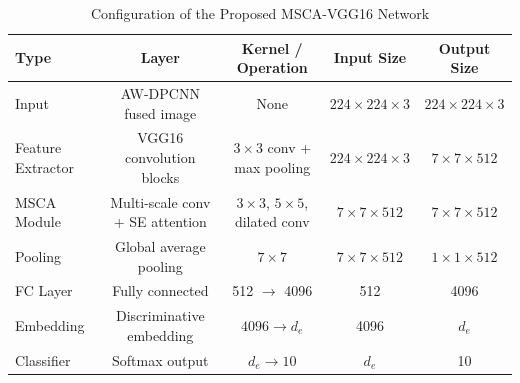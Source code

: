 \documentclass[journal]{IEEEtran}
\begin{document}
\begin{table}
	\centering
	\caption{Configuration of the Proposed MSCA-VGG16 Network}
	\begin{tabular}{lcccc}
		\toprule
		\textbf{Type} & \textbf{Layer} & \textbf{Kernel / Operation} & \textbf{Input Size} & \textbf{Output Size} \\
		\midrule
		Input & AW-DPCNN fused image & None & $224 \times 224 \times 3$ & $224 \times 224 \times 3$ \\
		Feature Extractor & VGG16 convolution blocks & $3\times3$ conv + max pooling & $224 \times 224 \times 3$ & $7 \times 7 \times 512$ \\
		MSCA Module & Multi-scale conv + SE attention & $3\times3$, $5\times5$, dilated conv & $7 \times 7 \times 512$ & $7 \times 7 \times 512$ \\
		Pooling & Global average pooling & $7\times7$ & $7 \times 7 \times 512$ & $1 \times 1 \times 512$ \\
		FC Layer & Fully connected & 512 $\rightarrow$ 4096 & 512 & 4096 \\
		Embedding & Discriminative embedding & $4096 \rightarrow d_e$ & 4096 & $d_e$ \\
		Classifier & Softmax output & $d_e \rightarrow 10$ & $d_e$ & 10 \\
		\bottomrule
	\end{tabular}
	\label{tab:msca_vgg16}
\end{table}
\end{document}
